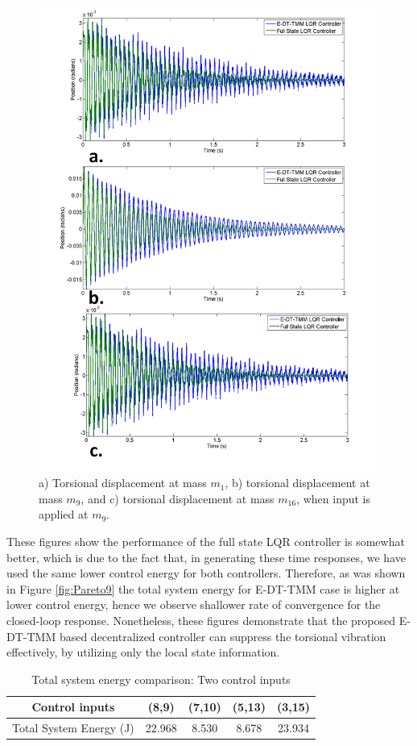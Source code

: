 \documentclass[11pt]{ucthesis}
\begin{document}
\begin{figure}[h]
\centering
\includegraphics[width=.65\linewidth]{Figures/Position.png}
\caption{a) Torsional displacement at mass $m_1$, b) torsional displacement at mass $m_9$, and c) torsional displacement at mass $m_{16}$, when input is applied at $m_9$.}
\label{time_m_1}
\end{figure}

These figures show the performance of the full state LQR controller is somewhat better, which is due to the fact that, in generating these time responses, we have used the same lower control energy for both controllers. Therefore, as was shown in Figure \ref{fig:Pareto9} the total system energy for E-DT-TMM case is higher at lower control energy, hence we observe shallower rate of convergence for the closed-loop response. Nonetheless, these figures demonstrate that the proposed E-DT-TMM based decentralized controller can suppress the torsional vibration effectively, by utilizing only the local state information.

\begin{table}
\begin{center}
\caption{Total system energy comparison: Two control inputs}
\label{t:twoinputs}
\begin{tabular}{|c||c|c|c|c|}
\hline
Control inputs & (8,9) & (7,10) & (5,13) & (3,15) \\
\hline
Total System Energy (J) & 22.968 & 8.530 & 8.678 & 23.934 \\ 
\hline
\end{tabular}
\end{center}
\end{table}
\end{document}
